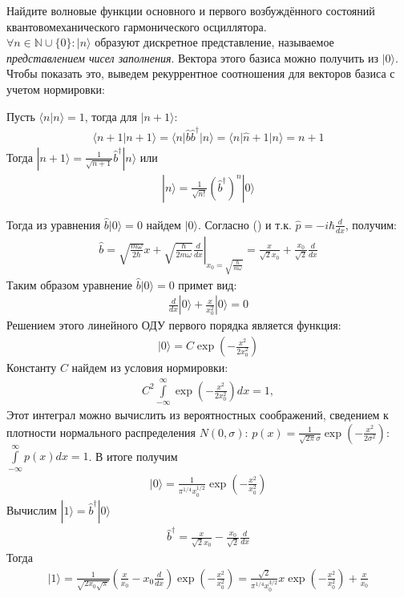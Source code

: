 \documentclass[__main__.tex]{subfiles}
\begin{document}
Найдите волновые функции основного и первого возбуждённого состояний квантовомеханического гармонического осциллятора.\\


$\forall n\in\mathbb{N}\cup\{0\}\colon|n\rangle$ образуют дискретное представление, называемое \textit{представлением чисел заполнения}. Вектора этого базиса можно получить из $|0\rangle$. Чтобы показать это, выведем рекуррентное соотношения для векторов базиса с учетом нормировки:

Пусть $\langle n|n\rangle=1$, тогда для $|n+1\rangle$:
\begin{gather*}
    \langle n+1|n+1\rangle = \langle n|\hat{b}\hat{b}^\dagger|n\rangle = \langle n|\hat{n}+1|n\rangle
    = n+1
\end{gather*}
Тогда $|n+1\rangle = \frac{1}{\sqrt{n+1}}\hat{b}^\dagger|n\rangle$ или
\begin{gather*}
    |n\rangle = \frac{1}{\sqrt{n!}}\left(\hat{b}^\dagger\right)^n|0\rangle
\end{gather*}

Тогда из уравнения $\hat{b}|0\rangle = 0$ найдем $|0\rangle$. Согласно () и т.к. $\hat{p}=-i\hbar\frac{d}{dx}$, получим:
\begin{gather*}
    \hat{b}
    =
    \left.
    \sqrt{\frac{m\omega}{2\hbar}}x+\sqrt{\frac{\hbar}{2m\omega}}\frac{d}{dx}
    \right|_{x_0=\sqrt{\frac{\hbar}{m\omega}}}
    =
    \frac{x}{\sqrt{2}x_0}+\frac{x_0}{\sqrt{2}}\frac{d}{dx}
\end{gather*}
Таким образом уравнение $\hat{b}|0\rangle = 0$ примет вид:
\begin{gather*}
    \frac{d}{dx}|0\rangle + \frac{x}{x_0^2}|0\rangle = 0
\end{gather*}
Решением этого линейного ОДУ первого порядка является функция:
\begin{gather*}
    |0\rangle = C\exp\left(-\frac{x^2}{2x_0^2}\right)
\end{gather*}
Константу $C$ найдем из условия нормировки:
\begin{gather*}
    C^2\int\limits_{-\infty}^{\infty}\exp\left(-\frac{x^2}{2x_0^2}\right)dx=1,
\end{gather*}
Этот интеграл можно вычислить из вероятностных соображений, сведением к плотности нормального распределения $N(0,\sigma)$: $p(x)=\frac{1}{\sqrt{2\pi}\sigma}\exp\left(-\frac{x^2}{2\sigma^2}\right)$: $\int\limits_{-\infty}^{\infty}p(x)dx=1$.
В итоге получим
\begin{gather*}
    |0\rangle = \frac{1}{\pi^{1/4}x_0^{1/2}}\exp\left(-\frac{x^2}{x_0^2}\right)
\end{gather*}
Вычислим $|1\rangle = \hat{b}^\dagger|0\rangle$
\begin{gather*}
    \hat{b}^\dagger
    =
    \frac{x}{\sqrt{2}x_0}-\frac{x_0}{\sqrt{2}}\frac{d}{dx}
\end{gather*}
Тогда
\begin{gather*}
    |1\rangle
    =
    \frac{1}{\sqrt{2x_0\sqrt{\pi}}}\left(\frac{x}{x_0}-x_0\frac{d}{dx}\right)\exp\left(-\frac{x^2}{x_0^2}\right)
    =
    \frac{\sqrt{2}}{\pi^{1/4}x_0^{3/2}}x\exp\left(-\frac{x^2}{x_0^2}\right) + \frac{x}{x_0}
\end{gather*}
\end{document}
